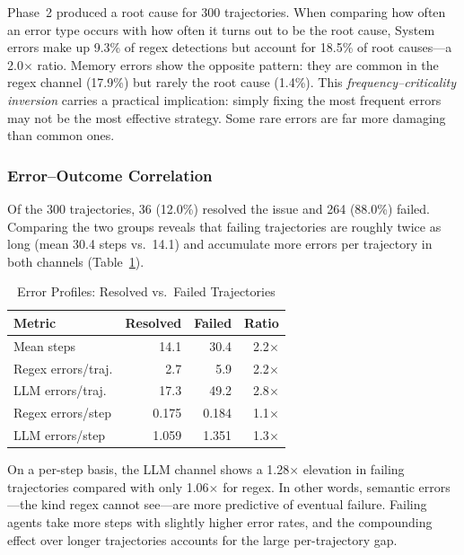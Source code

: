\documentclass{ieeeaccess}
\begin{document}
Phase~2 produced a root cause for 300 trajectories. When comparing how often an error type occurs with how often it turns out to be the root cause, System errors make up 9.3\% of regex detections but account for 18.5\% of root causes---a 2.0$\times$ ratio. Memory errors show the opposite pattern: they are common in the regex channel (17.9\%) but rarely the root cause (1.4\%). This \textit{frequency--criticality inversion} carries a practical implication: simply fixing the most frequent errors may not be the most effective strategy. Some rare errors are far more damaging than common ones.

\subsubsection{Error--Outcome Correlation}

Of the 300 trajectories, 36 (12.0\%) resolved the issue and 264 (88.0\%) failed. Comparing the two groups reveals that failing trajectories are roughly twice as long (mean 30.4 steps vs.\ 14.1) and accumulate more errors per trajectory in both channels (Table~\ref{tab:outcome}).

\begin{table}[h!]
\caption{Error Profiles: Resolved vs.\ Failed Trajectories}
\label{tab:outcome}
\centering
\setlength{\tabcolsep}{3pt}
\renewcommand{\arraystretch}{1.5}
\begin{tabularx}{\columnwidth}{|X|r|r|r|}
\hline
\textbf{Metric} & \textbf{Resolved} & \textbf{Failed} & \textbf{Ratio} \\
\hline
Mean steps            & 14.1  & 30.4  & 2.2$\times$ \\
\hline
Regex errors/traj.    & 2.7   & 5.9   & 2.2$\times$ \\
\hline
LLM errors/traj.      & 17.3  & 49.2  & 2.8$\times$ \\
\hline
Regex errors/step     & 0.175 & 0.184 & 1.1$\times$ \\
\hline
LLM errors/step       & 1.059 & 1.351 & 1.3$\times$ \\
\hline
\end{tabularx}
\end{table}

On a per-step basis, the LLM channel shows a 1.28$\times$ elevation in failing trajectories compared with only 1.06$\times$ for regex. In other words, semantic errors---the kind regex cannot see---are more predictive of eventual failure. Failing agents take more steps with slightly higher error rates, and the compounding effect over longer trajectories accounts for the large per-trajectory gap.
\end{document}
